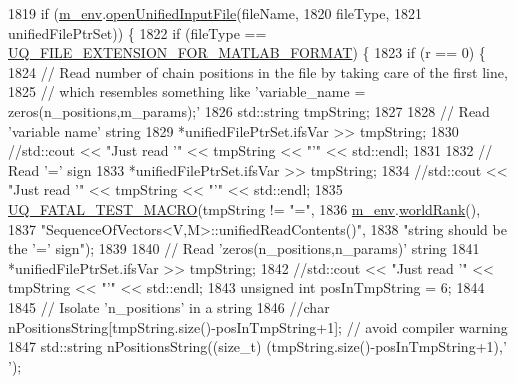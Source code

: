 \begin{DoxyCode}
1819         \textcolor{keywordflow}{if} (\hyperlink{class_q_u_e_s_o_1_1_base_vector_sequence_a8e8824d2a63c5a43bcc6473e3a0491e8}{m\_env}.\hyperlink{class_q_u_e_s_o_1_1_base_environment_acc1fb3152068b25e84845a0d6d203bcf}{openUnifiedInputFile}(fileName,
1820                                        fileType,
1821                                        unifiedFilePtrSet)) \{
1822           \textcolor{keywordflow}{if} (fileType == \hyperlink{_defines_8h_ac440026eff7deb1c1eed1eea0e8e36ba}{UQ\_FILE\_EXTENSION\_FOR\_MATLAB\_FORMAT}) \{
1823             \textcolor{keywordflow}{if} (r == 0) \{
1824               \textcolor{comment}{// Read number of chain positions in the file by taking care of the first line,}
1825               \textcolor{comment}{// which resembles something like 'variable\_name = zeros(n\_positions,m\_params);'}
1826         std::string tmpString;
1827 
1828               \textcolor{comment}{// Read 'variable name' string}
1829               *unifiedFilePtrSet.ifsVar >> tmpString;
1830         \textcolor{comment}{//std::cout << "Just read '" << tmpString << "'" << std::endl;}
1831 
1832               \textcolor{comment}{// Read '=' sign}
1833               *unifiedFilePtrSet.ifsVar >> tmpString;
1834           \textcolor{comment}{//std::cout << "Just read '" << tmpString << "'" << std::endl;}
1835               \hyperlink{_defines_8h_a56d63d18d0a6d45757de47fcc06f574d}{UQ\_FATAL\_TEST\_MACRO}(tmpString != \textcolor{stringliteral}{"="},
1836                                   \hyperlink{class_q_u_e_s_o_1_1_base_vector_sequence_a8e8824d2a63c5a43bcc6473e3a0491e8}{m\_env}.\hyperlink{class_q_u_e_s_o_1_1_base_environment_a78b57112bbd0e6dd0e8afec00b40ffa7}{worldRank}(),
1837                                   \textcolor{stringliteral}{"SequenceOfVectors<V,M>::unifiedReadContents()"},
1838                                   \textcolor{stringliteral}{"string should be the '=' sign"});
1839 
1840               \textcolor{comment}{// Read 'zeros(n\_positions,n\_params)' string}
1841               *unifiedFilePtrSet.ifsVar >> tmpString;
1842         \textcolor{comment}{//std::cout << "Just read '" << tmpString << "'" << std::endl;}
1843               \textcolor{keywordtype}{unsigned} \textcolor{keywordtype}{int} posInTmpString = 6;
1844 
1845               \textcolor{comment}{// Isolate 'n\_positions' in a string}
1846               \textcolor{comment}{//char nPositionsString[tmpString.size()-posInTmpString+1]; // avoid compiler warning}
1847         std::string nPositionsString((\textcolor{keywordtype}{size\_t}) (tmpString.size()-posInTmpString+1),\textcolor{charliteral}{' '});

\end{DoxyCode}
